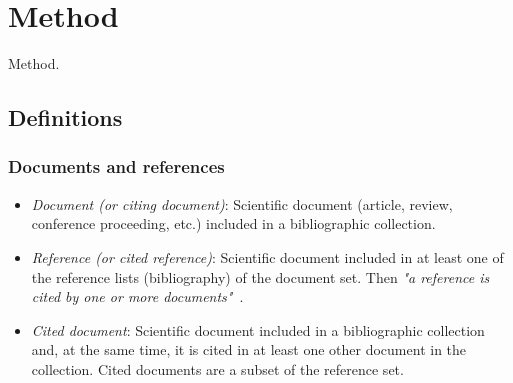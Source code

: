 \documentclass[aspectratio=169]{beamer}
\begin{document}
\section{Method}



\begin{frame}
    Method.
\end{frame}


\subsection{Definitions}


\begin{frame}
	\frametitle{Documents and references}
	\begin{itemize}
		\item \emph{Document (or citing document)}: Scientific document 
            (article, review, conference proceeding, etc.) included in a 
            bibliographic collection.
		\item \emph{Reference (or cited reference)}: Scientific document 
            included in at least one of the reference lists (bibliography) of 
            the document set. Then \emph{"a reference is cited by one or more 
            documents"}~\cite{aria2017}.
		\item \emph{Cited document}: Scientific document included in a
		      bibliographic collection and, at the same time, it is cited in at 
              least one other document in the collection. Cited documents are a 
              subset of the reference set.
	\end{itemize}
\end{frame}
\end{document}

